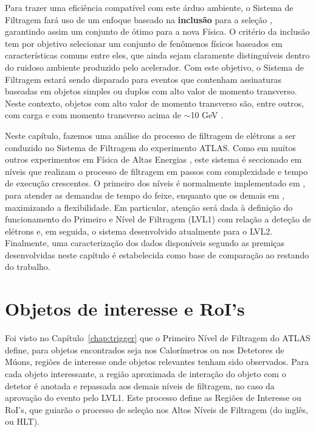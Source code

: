 Para trazer uma eficiência compatível com este árduo ambiente, o Sistema de
Filtragem fará uso de um enfoque baseado na \textbf{inclusão} para a seleção
, garantindo assim um conjunto de  ótimo para a nova
Física. O critério da inclusão tem por objetivo selecionar um conjunto de
fenômenos físicos baseados em características comuns entre eles, que ainda
sejam claramente distinguíveis dentro do ruidoso ambiente produzido pelo
acelerador. Com este objetivo, o Sistema de Filtragem estará sendo disparado
para eventos que contenham assinaturas baseadas em objetos simples ou duplos
com alto valor de momento transverso. Neste contexto, objetos com alto valor
de momento transverso são, entre outros,  com carga e com momento
transverso acima de $\sim$10 GeV \cite{hlt-tdr}.

Neste capítulo, fazemos uma análise do processo de filtragem de elétrons a ser
conduzido no Sistema de Filtragem do experimento ATLAS. Como em muitos outros
experimentos em Física de Altas Energias \cite{abolins-calor-2000,
monteiro-calor-1999}, este sistema é seccionado em níveis que realizam o
processo de filtragem em passos com complexidade e tempo de execução
crescentes. O primeiro dos níveis é normalmente implementado em
, para atender as demandas de tempo do feixe, enquanto que os
demais em , maximizando a flexibilidade. Em particular, atenção
será dada à definição do funcionamento do Primeiro e Nível de Filtragem (LVL1)
com relação a deteção de elétrons e, em seguida, o sistema desenvolvido
atualmente para o LVL2. Finalmente, uma caracterização dos dados disponíveis
segundo as premiças desenvolvidas neste capítulo é estabelecida como base de
comparação ao restando do trabalho.

\section{Objetos de interesse e RoI's}

Foi visto no Capítulo~\ref{chap:trigger} que o Primeiro Nível de Filtragem do
ATLAS define, para objetos encontrados seja nos Calorímetros ou nos Detetores
de Múons, regiões de interesse onde objetos relevantes tenham sido
observados. Para cada objeto interessante, a região aproximada de interação do
objeto com o detetor é anotada e repassada aos demais níveis de filtragem, no
caso da aprovação do evento pelo LVL1. Este processo define as Regiões de
Interesse ou RoI's, que guiarão o processo de seleção nos Altos Níveis de
Filtragem (do inglês,  ou HLT).

